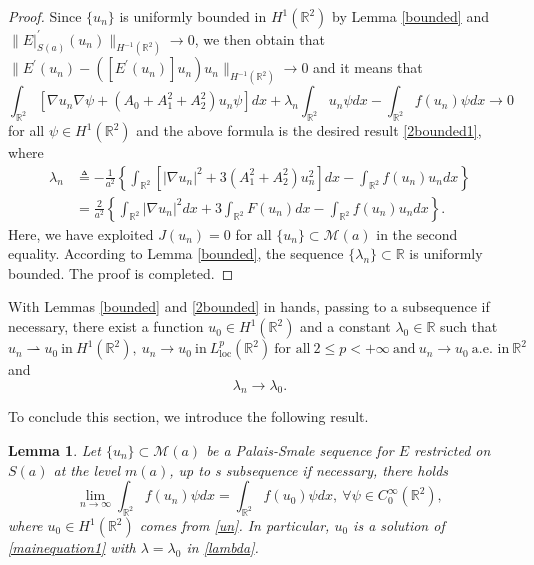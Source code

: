 \documentclass[11pt]{amsart}
\numberwithin{equation}{section}
\newtheorem{lemma}[theorem]{Lemma}
\theoremstyle{definition}
\newcommand{\R}{\mathbb{R}}
\begin{document}
\begin{proof}
Since $\{u_n\}$ is uniformly bounded in $H^1(\R^2)$ by Lemma \ref{bounded}
and $\|E|^\prime_{S(a)}(u_n)\|_{H^{-1}(\R^2)}\to0$, we then obtain
that $\|E^\prime(u_n)-([E^\prime(u_n)]u_n)u_n\|_{H^{-1}(\R^2)}\to0$ and it means that
\[
\int_{\R^2}[ \nabla u_n\nabla\psi  + (A_0+A_1^2+A_2^2)u_n\psi]dx+ \lambda_n\int_{\R^2}u_n\psi dx
-\int_{\R^2} f (u_n) \psi dx\to0
\]
for all $\psi\in H^1(\R^2)$ and the above formula is the desired result \eqref{2bounded1}, where
\begin{align}\label{lambda0}
\nonumber \lambda_n & \triangleq-\frac1{a^2}\left\{\int_{\R^2}[ |\nabla u_n|^2  + 3( A_1^2+A_2^2)u_n^2]dx
-\int_{\R^2} f (u_n)u_ndx\right\} \\
   & = \frac2{a^2}\left\{\int_{\R^2} |\nabla u_n|^2  dx+3\int_{\R^2} F(u_n)dx
-\int_{\R^2} f (u_n)u_ndx\right\}.
\end{align}
Here, we have exploited $J(u_n)=0$ for all $\{u_n\}\subset \mathcal{M}(a)$ in the second equality.
According to Lemma \ref{bounded}, the sequence $\{\lambda_n\}\subset \R$ is uniformly bounded.
The proof is completed.
\end{proof}

With Lemmas \ref{bounded}
and \ref{2bounded} in hands, passing to a subsequence if necessary, there exist a function $u_0\in H^1(\R^2)$
and a constant $\lambda_0\in\R$ such that
\begin{equation}\label{un}
u_n\rightharpoonup u_0 ~\text{in}~H^1(\R^2),~
u_n\to u_0 ~\text{in}~L^p_{\text{loc}}(\R^2)~\text{for all}~2\leq p<+\infty~\text{and}~
u_n\to u_0~\text{a.e. in}~ \R^2
\end{equation}
and
\begin{equation}\label{lambda}
\lambda_n\to\lambda_0.
\end{equation}

To conclude this section, we introduce the following result.

\begin{lemma}\label{solution}
Let $\{u_n\}\subset \mathcal{M}(a)$ be a Palais-Smale sequence for $E$ restricted on $S(a)$
at the level $m(a)$, up to s subsequence if necessary, there holds
\begin{equation}\label{solution1}
\lim_{n\to\infty}\int_{\R^2}f(u_n)\psi dx=\int_{\R^2}f(u_0)\psi dx,~\forall\psi\in C_0^\infty(\R^2),
\end{equation}
where $u_0\in H^1(\R^2)$ comes from \eqref{un}. In particular, $u_0$ is a solution of \eqref{mainequation1}
with $\lambda=\lambda_0$ in \eqref{lambda}.
\end{lemma}
\end{document}
